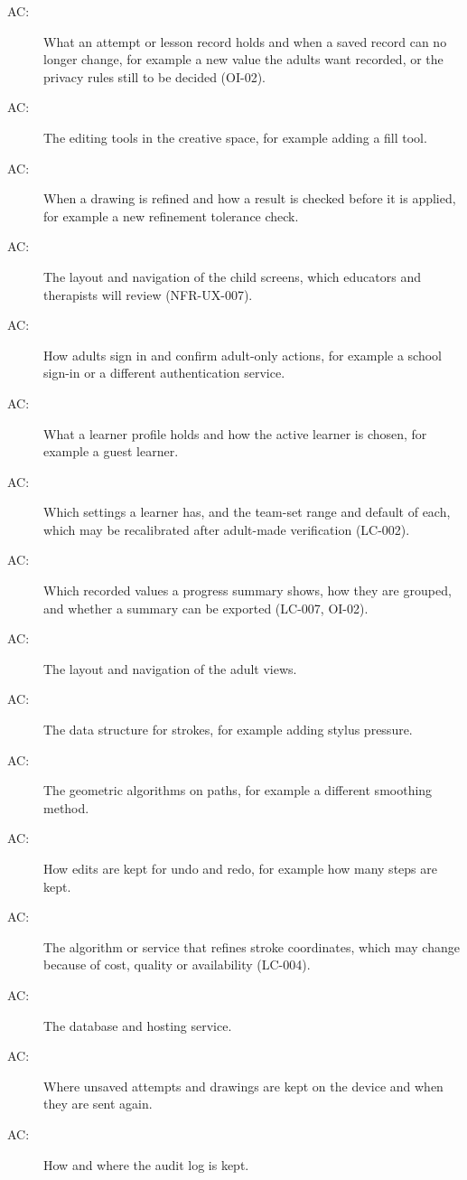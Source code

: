 \documentclass[12pt, titlepage]{article}
\newcounter{acnum}
\newcommand{\actheacnum}{AC\theacnum}
\begin{document}
\begin{description}
\item[ \actheacnum \label{acRecord}:] What an attempt or
  lesson record holds and when a saved record can no longer change, for example
  a new value the adults want recorded, or the privacy rules still to be
  decided (OI-02).
\item[ \actheacnum \label{acTools}:] The editing tools in
  the creative space, for example adding a fill tool.
\item[ \actheacnum \label{acRefineRules}:] When a drawing
  is refined and how a result is checked before it is applied, for example a
  new refinement tolerance check.
\item[ \actheacnum \label{acChildScreen}:] The layout and
  navigation of the child screens, which educators and therapists will review
  (NFR-UX-007).
\item[ \actheacnum \label{acAuth}:] How adults sign in and
  confirm adult-only actions, for example a school sign-in or a different
  authentication service.
\item[ \actheacnum \label{acProfile}:] What a learner
  profile holds and how the active learner is chosen, for example a guest
  learner.
\item[ \actheacnum \label{acSettings}:] Which settings a
  learner has, and the team-set range and default of each, which may be
  recalibrated after adult-made verification (LC-002).
\item[ \actheacnum \label{acSummary}:] Which recorded
  values a progress summary shows, how they are grouped, and whether a summary
  can be exported (LC-007, OI-02).
\item[ \actheacnum \label{acAdultView}:] The layout and
  navigation of the adult views.
\item[ \actheacnum \label{acStroke}:] The data structure
  for strokes, for example adding stylus pressure.
\item[ \actheacnum \label{acGeometry}:] The geometric
  algorithms on paths, for example a different smoothing method.
\item[ \actheacnum \label{acHistory}:] How edits are kept
  for undo and redo, for example how many steps are kept.
\item[ \actheacnum \label{acRefineEngine}:] The algorithm
  or service that refines stroke coordinates, which may change because of cost,
  quality or availability (LC-004).
\item[ \actheacnum \label{acStorage}:] The database and
  hosting service.
\item[ \actheacnum \label{acRecovery}:] Where unsaved
  attempts and drawings are kept on the device and when they are sent again.
\item[ \actheacnum \label{acLog}:] How and where the
  audit log is kept.
\end{description}
\end{document}
